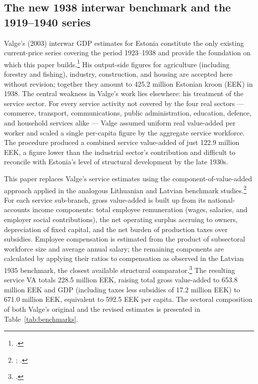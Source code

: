 \documentclass[12pt,a4paper]{article}
\newcommand{\eek}{EEK}                                  %
\begin{document}
\subsection{The new 1938 interwar benchmark and the 1919--1940 series}
\label{subsec:interwar}


Valge's (2003) interwar GDP estimates for Estonia constitute the only existing current-price series covering the period 1923--1938 and provide the foundation on which this paper builds.\footnote{\autocite{valge2003all}.} His output-side figures for agriculture (including forestry and fishing), industry, construction, and housing are accepted here without revision; together they amount to 425.2 million Estonian kroon (\eek) in 1938. The central weakness in Valge's work lies elsewhere: his treatment of the service sector. For every service activity not covered by the four real sectors — commerce, transport, communications, public administration, education, defence, and household services alike — Valge assumed uniform real value-added per worker and scaled a single per-capita figure by the aggregate service workforce. The procedure produced a combined service value-added of just 122.9 million \eek{}, a figure lower than the industrial sector's contribution and difficult to reconcile with Estonia's level of structural development by the late 1930s.

This paper replaces Valge's service estimates using the component-of-value-added approach applied in the analogous Lithuanian and Latvian benchmark studies.\footnote{\autocite{klimantas2019}; \autocite{norkuslatvia1935}.} For each service sub-branch, gross value-added is built up from its national-accounts income components: total employee remuneration (wages, salaries, and employer social contributions), the net operating surplus accruing to owners, depreciation of fixed capital, and the net burden of production taxes over subsidies. Employee compensation is estimated from the product of subsectoral workforce size and average annual salary; the remaining components are calculated by applying their ratios to compensation as observed in the Latvian 1935 benchmark, the closest available structural comparator.\footnote{\autocite{norkuslatvia1935}.} The resulting service VA totals 228.5 million \eek{}, raising total gross value-added to 653.8 million \eek{} and GDP (including taxes less subsidies of 17.2 million \eek{}) to 671.0 million \eek, equivalent to 592.5 \eek{} per capita. The sectoral composition of both Valge's original and the revised estimates is presented in Table~\ref{tab:benchmarks}.
\end{document}
